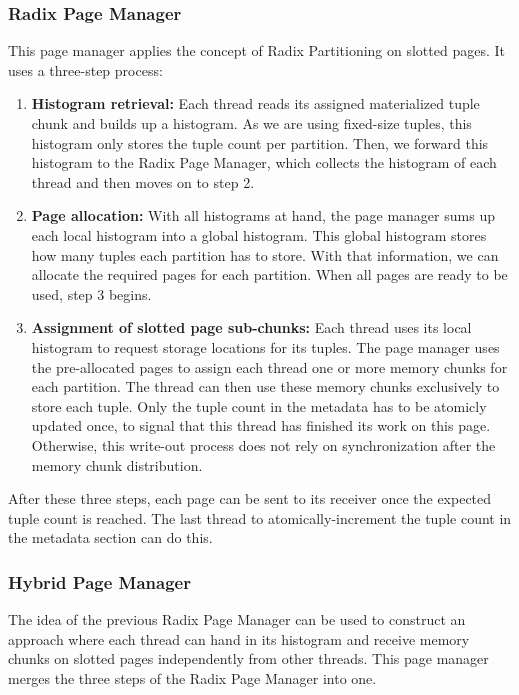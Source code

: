 \subsubsection{Radix Page Manager} \label{subsubsection-Radix-Page-Manager}
This page manager applies the concept of Radix Partitioning on slotted pages.
It uses a three-step process:
\begin{enumerate}
  \item \textbf{Histogram retrieval:}
        Each thread reads its assigned materialized tuple chunk and builds up a histogram.
        As we are using fixed-size tuples, this histogram only stores the tuple count per partition.
        Then, we forward this histogram to the Radix Page Manager, which collects the histogram of each thread and then moves on to step 2.

  \item \textbf{Page allocation:}
        With all histograms at hand, the page manager sums up each local histogram into a global histogram.
        This global histogram stores how many tuples each partition has to store.
        With that information, we can allocate the required pages for each partition.
        When all pages are ready to be used, step 3 begins.

  \item \textbf{Assignment of slotted page sub-chunks:}
        Each thread uses its local histogram to request storage locations for its tuples.
        The page manager uses the pre-allocated pages to assign each thread one or more memory chunks for each partition.
        The thread can then use these memory chunks exclusively to store each tuple.
        Only the tuple count in the metadata has to be atomicly updated once, to signal that this thread has finished its work on this page.
        Otherwise, this write-out process does not rely on synchronization after the memory chunk distribution.
\end{enumerate}
After these three steps, each page can be sent to its receiver once the expected tuple count is reached.
The last thread to atomically-increment the tuple count in the metadata section can do this.

\subsubsection{Hybrid Page Manager} \label{subsubsection-Hybrid-Page-Manager}
The idea of the previous Radix Page Manager can be used to construct an approach where each thread can hand in its histogram and receive memory chunks on slotted pages independently from other threads.
This page manager merges the three steps of the Radix Page Manager into one.

